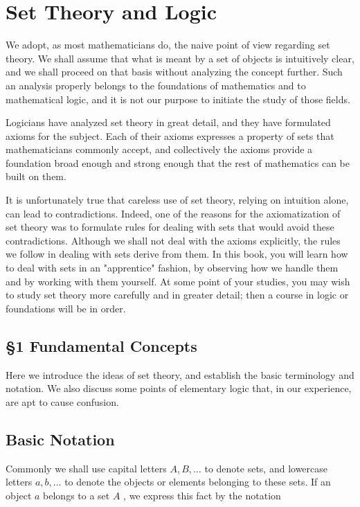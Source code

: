 \chapter{Set Theory and Logic}

We adopt, as most mathematicians do, the naive point of view\cite{Halmos1960} regarding set theory. We shall assume that what is meant by a set of objects is intuitively clear, and we shall proceed on that basis without analyzing the concept further. Such an analysis properly belongs to the foundations of mathematics\cite{Wilder1965} and to mathematical logic, and it is not our purpose to initiate the study of those fields.

Logicians have analyzed set theory in great detail, and they have formulated axioms for the subject. Each of their axioms expresses a property of sets that mathematicians commonly accept, and collectively the axioms provide a foundation broad enough and strong enough that the rest of mathematics can be built on them.

It is unfortunately true that careless use of set theory, relying on intuition alone, can lead to contradictions. Indeed, one of the reasons for the axiomatization of set theory was to formulate rules for dealing with sets that would avoid these contradictions. Although we shall not deal with the axioms explicitly, the rules we follow in dealing with sets derive from them. In this book, you will learn how to deal with sets in an "apprentice" fashion, by observing how we handle them and by working with them yourself. At some point of your studies, you may wish to study set theory more carefully and in greater detail; then a course in logic or foundations will be in order.

\section*{§1 Fundamental Concepts}

Here we introduce the ideas of set theory, and establish the basic terminology and notation. We also discuss some points of elementary logic that, in our experience, are apt to cause confusion.

\section*{Basic Notation}

Commonly we shall use capital letters \(A,B,\ldots\) to denote sets, and lowercase letters \(a,b,\ldots\) to denote the objects or elements belonging to these sets. If an object \(a\) belongs to a set \(A\) , we express this fact by the notation

